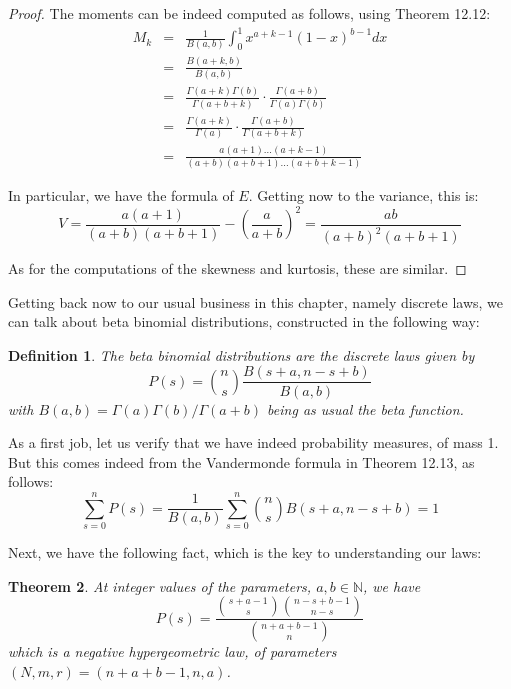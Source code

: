 \documentclass[12pt]{amsbook}
\newtheorem{theorem}{Theorem}[chapter]
\newtheorem{definition}[theorem]{Definition}
\begin{document}
\begin{proof}
The moments can be indeed computed as follows, using Theorem 12.12:
\begin{eqnarray*}
M_k
&=&\frac{1}{B(a,b)}\int_0^1x^{a+k-1}(1-x)^{b-1}dx\\
&=&\frac{B(a+k,b)}{B(a,b)}\\
&=&\frac{\Gamma(a+k)\Gamma(b)}{\Gamma(a+b+k)}\cdot\frac{\Gamma(a+b)}{\Gamma(a)\Gamma(b)}\\
&=&\frac{\Gamma(a+k)}{\Gamma(a)}\cdot\frac{\Gamma(a+b)}{\Gamma(a+b+k)}\\
&=&\frac{a(a+1)\ldots(a+k-1)}{(a+b)(a+b+1)\ldots(a+b+k-1)}
\end{eqnarray*}

In particular, we have the formula of $E$. Getting now to the variance, this is:
$$V=\frac{a(a+1)}{(a+b)(a+b+1)}-\left(\frac{a}{a+b}\right)^2
=\frac{ab}{(a+b)^2(a+b+1)}$$

As for the computations of the skewness and kurtosis, these are similar.
\end{proof}

Getting back now to our usual business in this chapter, namely discrete laws, we can talk about beta binomial distributions, constructed in the following way:


\begin{definition}
The beta binomial distributions are the discrete laws given by
$$P(s)=\binom{n}{s}\frac{B(s+a,n-s+b)}{B(a,b)}$$
with $B(a,b)=\Gamma(a)\Gamma(b)/\Gamma(a+b)$ being as usual the beta function.
\end{definition}

As a first job, let us verify that we have indeed probability measures, of mass 1. But this comes indeed from the Vandermonde formula in Theorem 12.13, as follows:
$$\sum_{s=0}^nP(s)
=\frac{1}{B(a,b)}\sum_{s=0}^n\binom{n}{s}B(s+a,n-s+b)
=1$$

Next, we have the following fact, which is the key to understanding our laws:

\begin{theorem}
At integer values of the parameters, $a,b\in\mathbb N$, we have
$$P(s)=\frac{\binom{s+a-1}{s}\binom{n-s+b-1}{n-s}}{\binom{n+a+b-1}{n}}$$
which is a negative hypergeometric law, of parameters $(N,m,r)=(n+a+b-1,n,a)$.
\end{theorem}
\end{document}
